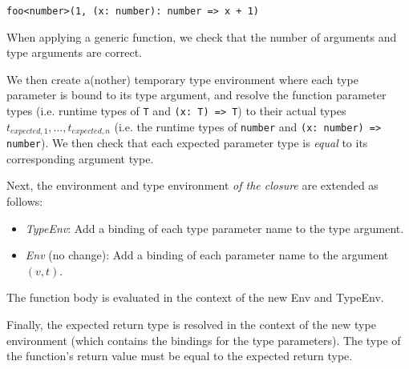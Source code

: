 \begin{center}
    \verb|foo<number>(1, (x: number): number => x + 1)|
\end{center}

When applying a generic function, we check that the number of arguments and type arguments are correct.

We then create a(nother) temporary type environment where each type parameter is bound to its type argument, and resolve the function parameter types (i.e. runtime types of \verb|T| and \verb|(x: T) => T|) to their actual types $t_{expected,1}, \dots, t_{expected,n}$ 
(i.e. the runtime types of \verb|number| and \verb|(x: number) => number|).
We then check that each expected parameter type is \textit{equal} to its corresponding argument type.

Next, the environment and type environment \textit{of the closure} are extended as follows:
\begin{itemize}
    \item \textit{TypeEnv}: Add a binding of each type parameter name to the type argument.
    \item \textit{Env} (no change): Add a binding of each parameter name to the argument $(v, t)$.
\end{itemize}
The function body is evaluated in the context of the new Env and TypeEnv.

Finally, the expected return type is resolved in the context of the new type environment (which contains the bindings for the type parameters). The type of the function's return value must be equal to the expected return type.




